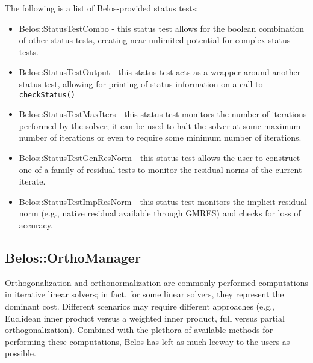 The following is a list of Belos-provided status tests:
\begin{itemize}
  \item Belos::StatusTestCombo - this status test allows for the boolean combination of
    other status tests, creating near unlimited potential for complex status tests.
  \item Belos::StatusTestOutput - this status test acts as a wrapper around another
    status test, allowing for printing of status information on a call to
    \verb!checkStatus()!
  \item Belos::StatusTestMaxIters - this status test monitors the number of iterations
    performed by the solver; it can be used to halt the solver at some maximum number of iterations
    or even to require some minimum number of iterations.
  \item Belos::StatusTestGenResNorm - this status test allows the user to construct one of
    a family of residual tests to monitor the residual norms of the current iterate.
  \item Belos::StatusTestImpResNorm - this status test monitors the implicit residual norm
    (e.g., native residual available through GMRES) and checks for loss of accuracy.
\end{itemize}

\subsection{Belos::OrthoManager}
\label{sec:belos:ortho}

Orthogonalization and orthonormalization are commonly performed computations in iterative
linear solvers; in fact, for some linear solvers, they represent the dominant cost.  Different
scenarios may require different approaches (e.g., Euclidean inner product versus a weighted inner
product, full versus partial orthogonalization).  Combined with the plethora
of available methods for performing these computations, Belos has left as much leeway to
the users as possible.

